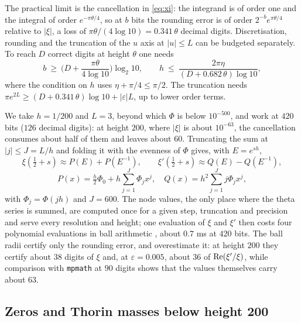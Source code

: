 The practical limit is the cancellation in \eqref{eq:xi}: the integrand is of order one and the integral of order $e^{-\pi\theta/4}$, so at $b$ bits the rounding error is of order $2^{-b}e^{\pi\theta/4}$ relative to $|\xi|$, a loss of $\pi\theta/(4\log10)=0.341\,\theta$ decimal digits. Discretisation, rounding and the truncation of the $u$ axis at $|u|\le L$ can be budgeted separately. To reach $D$ correct digits at height $\theta$ one needs
\[
b\ \ge\ \Big(D+\frac{\pi\theta}{4\log10}\Big)\log_2 10,\qquad h\ \le\ \frac{2\pi\eta}{(D+0.682\,\theta)\log10},
\]
where the condition on $h$ uses $\eta+\pi/4\le\pi/2$. The truncation needs $\pi e^{2L}\ge(D+0.341\,\theta)\log10+|\varepsilon|L$, up to lower order terms.

We take $h=1/200$ and $L=3$, beyond which $\Phi$ is below $10^{-500}$, and work at $420$ bits ($126$ decimal digits): at height $200$, where $|\xi|$ is about $10^{-63}$, the cancellation consumes about half of them and leaves about $60$. Truncating the sum at $|j|\le J=L/h$ and folding it with the evenness of $\Phi$ gives, with $E=e^{sh}$,
\[
\xi(\tfrac12+s)\approx P(E)+P(E^{-1}),\qquad \xi'(\tfrac12+s)\approx Q(E)-Q(E^{-1}),
\]
\[
P(x)=\tfrac h2\Phi_0+h\sum_{j=1}^{J}\Phi_jx^j,\quad Q(x)=h^2\sum_{j=1}^{J}j\Phi_jx^j,
\]
with $\Phi_j=\Phi(jh)$ and $J=600$. The node values, the only place where the theta series is summed, are computed once for a given step, truncation and precision and serve every resolution and height; one evaluation of $\xi$ and $\xi'$ then costs four polynomial evaluations in ball arithmetic \cite{Arb}, about $0.7$ ms at $420$ bits. The ball radii certify only the rounding error, and overestimate it: at height $200$ they certify about $38$ digits of $\xi$ and, at $\varepsilon=0.005$, about $36$ of $\operatorname{Re}(\xi'/\xi)$, while comparison with \texttt{mpmath} at $90$ digits shows that the values themselves carry about $63$.

\subsection{Zeros and Thorin masses below height 200}\label{sec:ch4:height200}

